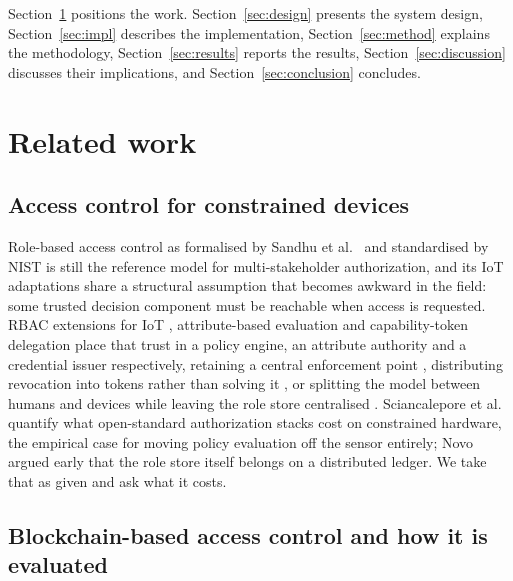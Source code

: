 \documentclass[a4paper,fleqn]{cas-sc}
\begin{document}
Section~\ref{sec:related} positions the work. Section~\ref{sec:design}
presents the system design, Section~\ref{sec:impl} describes the
implementation, Section~\ref{sec:method} explains the methodology,
Section~\ref{sec:results} reports the results, Section~\ref{sec:discussion}
discusses their implications, and Section~\ref{sec:conclusion} concludes.

\section{Related work}
\label{sec:related}

\subsection{Access control for constrained devices}
\label{subsec:rw_models}

Role-based access control as formalised by Sandhu et al.\ \cite{sandhu1996role}
and standardised by NIST \cite{ferraiolo2001role} is still the reference
model for multi-stakeholder authorization, and its IoT adaptations share a
structural assumption that becomes awkward in the field: some trusted
decision component must be reachable when access is requested. RBAC
extensions for IoT \cite{ye2015iot}, attribute-based evaluation
\cite{hu2014guide,servos2017abac,sciancalepore2017oauth} and capability-token
delegation \cite{hernandez2017capability} place that trust in a policy
engine, an attribute authority and a credential issuer respectively,
retaining a central enforcement point \cite{ye2015iot,servos2017abac},
distributing revocation into tokens rather than solving it
\cite{hernandez2017capability}, or splitting the model between humans and
devices while leaving the role store centralised
\cite{alshehri2016access}. Sciancalepore et
al.\ \cite{sciancalepore2017oauth} quantify what open-standard authorization
stacks cost on constrained hardware, the empirical case for moving policy
evaluation off the sensor entirely; Novo \cite{novo2018blockchain} argued
early that the role store itself belongs on a distributed ledger. We take
that as given and ask what it costs.

\subsection{Blockchain-based access control and how it is evaluated}
\label{subsec:rw_blockchain}
\end{document}
